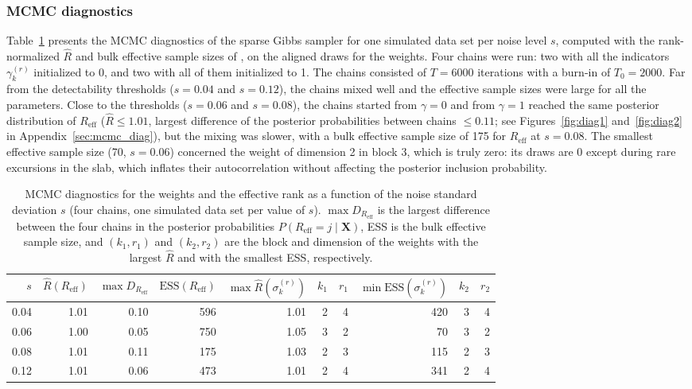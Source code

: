 \documentclass[11pt]{article}
\newcommand{\X}{\mathbf{X}}
\newcommand{\Reff}{R_{\mathrm{eff}}}
\begin{document}
\subsubsection*{MCMC diagnostics} Table~\ref{tab:mcmc_diag} presents the MCMC diagnostics of the sparse Gibbs sampler for one simulated data set per noise level $s$, computed with the rank-normalized $\hat R$ and bulk effective sample sizes of \citet{vehtari2021}, on the aligned draws for the weights. Four chains were run: two with all the indicators $\gamma_k^{(r)}$ initialized to 0, and two with all of them initialized to 1. The chains consisted of $T=6000$ iterations with a burn-in of $T_0=2000$. Far from the detectability thresholds ($s=0.04$ and $s=0.12$), the chains mixed well and the effective sample sizes were large for all the parameters. Close to the thresholds ($s=0.06$ and $s=0.08$), the chains started from $\gamma=0$ and from $\gamma=1$ reached the same posterior distribution of $\Reff$ ($\hat R\leq1.01$, largest difference of the posterior probabilities between chains $\leq0.11$; see Figures~\ref{fig:diag1} and~\ref{fig:diag2} in Appendix~\ref{sec:mcmc_diag}), but the mixing was slower, with a bulk effective sample size of 175 for $\Reff$ at $s=0.08$. The smallest effective sample size (70, $s=0.06$) concerned the weight of dimension 2 in block 3, which is truly zero: its draws are 0 except during rare excursions in the slab, which inflates their autocorrelation without affecting the posterior inclusion probability.  
\begin{table}[ht]
\centering
\begin{tabular}{rrrrrrrrrr}
  \hline
$s$ & $\hat R(\Reff)$ &$\max D_{\Reff}$ & $\mathrm{ESS}(\Reff)$ & $\max\hat R(\sigma^{(r)}_k)$ & $k_1$  & $r_1$ & $\min\mathrm{ESS}(\sigma^{(r)}_k)$ & $k_2$ & $r_2$  \\
  \hline
0.04 & 1.01 & 0.10 & 596 & 1.01 &   2 &   4 & 420 &   3 &   4 \\ 
  0.06 & 1.00 & 0.05 & 750 & 1.05 &   3 &   2 & 70 &   3 &   2 \\ 
  0.08 & 1.01 & 0.11 & 175 & 1.03 &   2 &   3 & 115 &   2 &   3 \\ 
  0.12 & 1.01 & 0.06 & 473 & 1.01 &   2 &   4 & 341 &   2 &   4 \\ 
   \hline
\end{tabular}
\caption{MCMC diagnostics for the weights and the effective rank as a function of the noise standard deviation $s$ (four chains, one simulated data set per value of $s$). $\max D_{\Reff}$ is the largest difference between the four chains in the posterior probabilities $P(\Reff=j\mid\X)$, ESS is the bulk effective sample size, and $(k_1,r_1)$ and $(k_2,r_2)$ are the block and dimension of the weights with the largest $\hat R$ and with the smallest ESS, respectively. \label{tab:mcmc_diag}}
\end{table}
\end{document}
